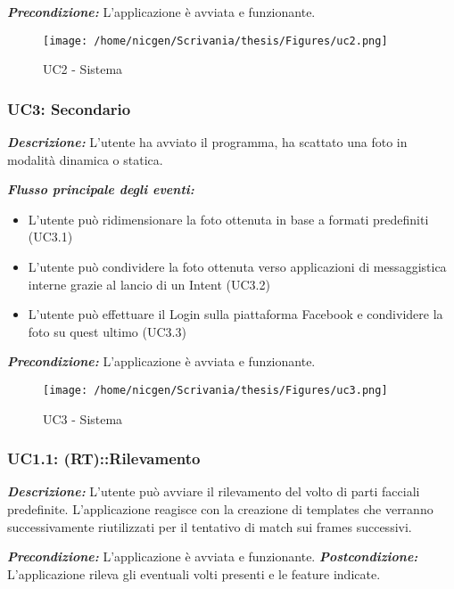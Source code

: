 \textbf{\textit{Precondizione:}} L'applicazione è avviata e funzionante.

\begin{figure}[H]\centering  
\texttt{[image: /home/nicgen/Scrivania/thesis/Figures/uc2.png]}
\caption[UC2 - Sistema]{UC2 - Sistema}
\label{pic-a}
\end{figure}


\subsubsection{UC3: Secondario}

\textbf{\textit{Descrizione:}} L'utente ha avviato il programma, ha scattato una foto in modalità dinamica o statica.

\textbf{\textit{Flusso principale degli eventi:}} 

\begin{itemize}
\item L'utente può ridimensionare la foto ottenuta in base a formati predefiniti (UC3.1)
\item L'utente può condividere la foto ottenuta verso applicazioni di messaggistica interne grazie al lancio di un Intent (UC3.2)
\item L'utente può effettuare il Login sulla piattaforma Facebook e condividere la foto su quest ultimo (UC3.3)
\end{itemize}

\textbf{\textit{Precondizione:}} L'applicazione è avviata e funzionante.

\begin{figure}[H]\centering  
\texttt{[image: /home/nicgen/Scrivania/thesis/Figures/uc3.png]}
\caption[UC3 - Sistema]{UC3 - Sistema}
\label{pic-a}
\end{figure}


\subsubsection{UC1.1: (RT)::Rilevamento}

\textbf{\textit{Descrizione:}} L'utente può avviare il rilevamento del volto di parti facciali predefinite. L'applicazione reagisce con la creazione di templates che verranno successivamente riutilizzati per il tentativo di match sui frames successivi.


\textbf{\textit{Precondizione:}} L'applicazione è avviata e funzionante.
\textbf{\textit{Postcondizione:}} L'applicazione rileva gli eventuali volti presenti e le feature indicate.



